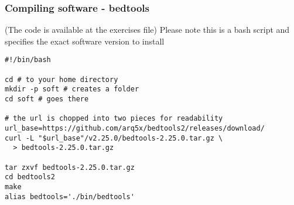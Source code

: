 \documentclass{beamer}
\begin{document}







\begin{frame}[fragile]
  \frametitle{Compiling software -  bedtools}
  (The code is available at the exercises file)
Please note this is a bash script and specifies the exact software version to install

   \begin{small}
\begin{verbatim}
#!/bin/bash

cd # to your home directory
mkdir -p soft # creates a folder
cd soft # goes there

# the url is chopped into two pieces for readability
url_base=https://github.com/arq5x/bedtools2/releases/download/
curl -L "$url_base"/v2.25.0/bedtools-2.25.0.tar.gz \
  > bedtools-2.25.0.tar.gz

tar zxvf bedtools-2.25.0.tar.gz
cd bedtools2
make
alias bedtools='./bin/bedtools'
\end{verbatim}
  \end{small}
\end{frame}
\end{document}

